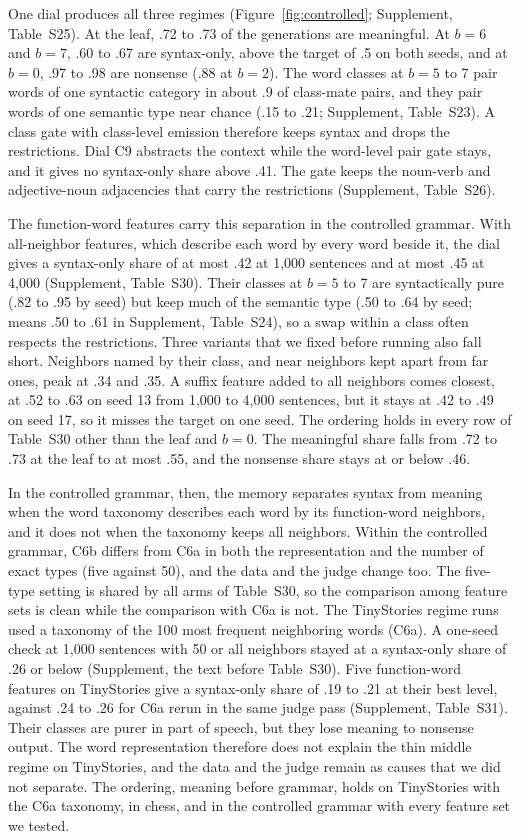 \documentclass[11pt,letterpaper]{article}
\begin{document}
One dial produces all three regimes (Figure~\ref{fig:controlled}; Supplement, Table~S25). At the leaf, .72 to .73 of the generations are meaningful. At $b=6$ and $b=7$, .60 to .67 are syntax-only, above the target of .5 on both seeds, and at $b=0$, .97 to .98 are nonsense (.88 at $b=2$).
The word classes at $b=5$ to 7 pair words of one syntactic category in about .9 of class-mate pairs, and they pair words of one semantic type near chance (.15 to .21; Supplement, Table~S23). A class gate with class-level emission therefore keeps syntax and drops the restrictions.
Dial C9 abstracts the context while the word-level pair gate stays, and it gives no syntax-only share above .41. The gate keeps the noun-verb and adjective-noun adjacencies that carry the restrictions (Supplement, Table~S26).

The function-word features carry this separation in the controlled grammar. With all-neighbor features, which describe each word by every word beside it, the dial gives a syntax-only share of at most .42 at 1,000 sentences and at most .45 at 4,000 (Supplement, Table~S30).
Their classes at $b=5$ to 7 are syntactically pure (.82 to .95 by seed) but keep much of the semantic type (.50 to .64 by seed; means .50 to .61 in Supplement, Table~S24), so a swap within a class often respects the restrictions.
Three variants that we fixed before running also fall short. Neighbors named by their class, and near neighbors kept apart from far ones, peak at .34 and .35. A suffix feature added to all neighbors comes closest, at .52 to .63 on seed 13 from 1,000 to 4,000 sentences, but it stays at .42 to .49 on seed 17, so it misses the target on one seed.
The ordering holds in every row of Table~S30 other than the leaf and $b=0$. The meaningful share falls from .72 to .73 at the leaf to at most .55, and the nonsense share stays at or below .46.

In the controlled grammar, then, the memory separates syntax from meaning when the word taxonomy describes each word by its function-word neighbors, and it does not when the taxonomy keeps all neighbors.
Within the controlled grammar, C6b differs from C6a in both the representation and the number of exact types (five against 50), and the data and the judge change too. The five-type setting is shared by all arms of Table~S30, so the comparison among feature sets is clean while the comparison with C6a is not.
The TinyStories regime runs used a taxonomy of the 100 most frequent neighboring words (C6a). A one-seed check at 1,000 sentences with 50 or all neighbors stayed at a syntax-only share of .26 or below (Supplement, the text before Table~S30).
Five function-word features on TinyStories give a syntax-only share of .19 to .21 at their best level, against .24 to .26 for C6a rerun in the same judge pass (Supplement, Table~S31).
Their classes are purer in part of speech, but they lose meaning to nonsense output. The word representation therefore does not explain the thin middle regime on TinyStories, and the data and the judge remain as causes that we did not separate.
The ordering, meaning before grammar, holds on TinyStories with the C6a taxonomy, in chess, and in the controlled grammar with every feature set we tested.
\end{document}
